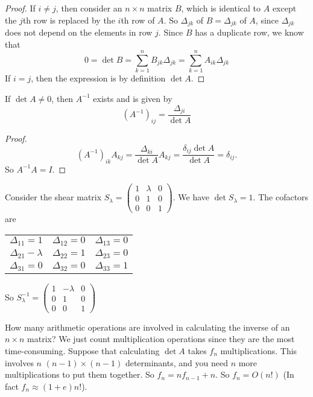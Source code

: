 \documentclass[a4paper]{article}
\begin{document}
\begin{proof}
  If $i \not= j$, then consider an $n\times n$ matrix $B$, which is identical to $A$ except the $j$th row is replaced by the $i$th row of $A$. So $\Delta_{jk}$ of $B = \Delta_{jk}$ of $A$, since $\Delta_{jk}$ does not depend on the elements in row $j$. Since $B$ has a duplicate row, we know that
  \[
  0 = \det B = \sum_{k = 1}^n B_{jk}\Delta_{jk} = \sum_{k = 1}^n A_{ik}\Delta_{jk}
  \]
  If $i = j$, then the expression is by definition $\det A$.
\end{proof}

\begin{thm}
  If $\det A \not =0$, then $A^{-1}$ exists and is given by
  \[
  (A^{-1})_{ij} = \frac{\Delta_{ji}}{\det A}
  \]
\end{thm}

\begin{proof}
  \[
  (A^{-1})_{ik}A_{kj} = \frac{\Delta_{ki}}{\det A} A_{kj} = \frac{\delta_{ij}\det A}{\det A} = \delta_{ij}.
  \]
  So $A^{-1}A = I$.
\end{proof}

\begin{eg}
  Consider the shear matrix $S_\lambda = \begin{pmatrix} 1 & \lambda & 0 \\ 0 & 1 & 0\\ 0 & 0 & 1\end{pmatrix}$. We have $\det{S_\lambda} = 1$. The cofactors are\\
    \begin{tabular}{ccc}
      $\Delta_{11} = 1$       & $\Delta_{12} = 0$ & $\Delta_{13} = 0$ \\
      $\Delta_{21} - \lambda$ & $\Delta_{22} = 1$ & $\Delta_{23} = 0$ \\
      $\Delta_{31} = 0$       & $\Delta_{32} = 0$ & $\Delta_{33} = 1$
    \end{tabular}

    So $S_\lambda^{-1} = \begin{pmatrix} 1 & -\lambda & 0\\ 0 & 1 & 0\\ 0 & 0 & 1\end{pmatrix}$
\end{eg}

How many arithmetic operations are involved in calculating the inverse of an $n\times n$ matrix? We just count multiplication operations since they are the most time-consuming. Suppose that calculating $\det A$ takes $f_n$ multiplications. This involves $n$ $(n - 1)\times (n - 1)$ determinants, and you need $n$ more multiplications to put them together. So $f_n = nf_{n -1} + n$. So $f_n = O(n!)$ (In fact $f_n \approx (1 + e)n!$).
\end{document}
